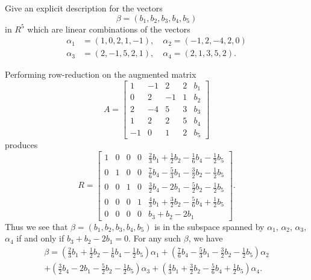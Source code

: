  Give an explicit description for the vectors
\begin{equation*}
  \beta = (b_1, b_2, b_3, b_4, b_5)
\end{equation*}
in $R^5$ which are linear combinations of the vectors
\begin{align*}
  \alpha_1 &= (1, 0, 2, 1, -1), \quad \alpha_2 = (-1, 2, -4, 2, 0) \\
  \alpha_3 &= (2, -1, 5, 2, 1), \quad \alpha_4 = (2, 1, 3, 5, 2).
\end{align*}
\begin{solution}
  Performing row-reduction on the augmented matrix
  \begin{equation*}
    A =
    \begin{bmatrix}
      1 & -1 & 2 & 2 & b_1 \\
      0 & 2 & -1 & 1 & b_2 \\
      2 & -4 & 5 & 3 & b_3 \\
      1 & 2 & 2 & 5 & b_4 \\
      -1 & 0 & 1 & 2 & b_5
    \end{bmatrix}
  \end{equation*}
  produces
  \begin{equation*}
    R =
    \begin{bmatrix}
      1 & 0 & 0 & 0 & \frac23b_1 + \frac12b_2 - \frac16b_4 - \frac12b_5 \\[3pt]
      0 & 1 & 0 & 0 & \frac76b_4 - \frac53b_1 - \frac32b_2 - \frac12b_5 \\[3pt]
      0 & 0 & 1 & 0 & \frac32b_4 - 2b_1 - \frac52b_2 - \frac12b_5 \\[3pt]
      0 & 0 & 0 & 1 & \frac43b_1 + \frac32b_2 - \frac56b_4 + \frac12b_5 \\[3pt]
      0 & 0 & 0 & 0 & b_3 + b_2 - 2b_1
    \end{bmatrix}.
  \end{equation*}
  Thus we see that $\beta = (b_1,b_2,b_3,b_4,b_5)$ is in the subspace
  spanned by $\alpha_1$, $\alpha_2$, $\alpha_3$, $\alpha_4$ if and
  only if $b_3 + b_2 - 2b_1 = 0$. For any such $\beta$, we have
  \begin{multline*}
    \beta
    = \left(\frac23b_1 + \frac12b_2 - \frac16b_4 - \frac12b_5\right)\alpha_1
    + \left(\frac76b_4 - \frac53b_1 - \frac32b_2 - \frac12b_5\right)\alpha_2 \\
    + \left(\frac32b_4 - 2b_1 - \frac52b_2 - \frac12b_5\right)\alpha_3
    + \left(\frac43b_1 + \frac32b_2 - \frac56b_4 + \frac12b_5\right)\alpha_4.
  \end{multline*}
\end{solution}

